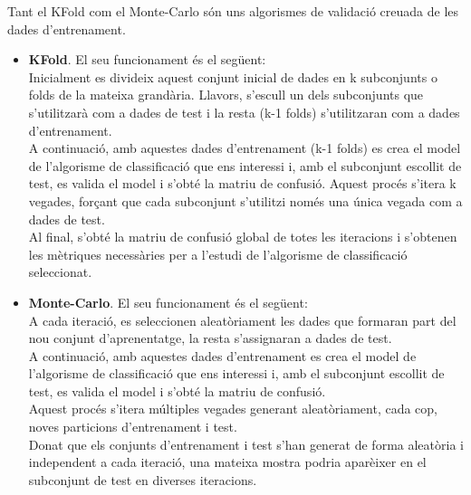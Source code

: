 \documentclass{article} %
\begin{document}
{\color{blue}
	Tant el KFold com el Monte-Carlo són uns algorismes de validació creuada de les dades d'entrenament. \\

	\begin{itemize}
		\item {
			\textbf{KFold}. El seu funcionament és el següent: \\

			Inicialment es divideix aquest conjunt inicial de dades en k subconjunts o folds de la mateixa grandària. Llavors, s'escull un dels subconjunts que s'utilitzarà com a dades de test i la resta (k-1 folds) s'utilitzaran com a dades d'entrenament. \\

			A continuació, amb aquestes dades d'entrenament (k-1 folds) es crea el model de l'algorisme de classificació que ens interessi i, amb el subconjunt escollit de test, es valida el model i s'obté la matriu de confusió. Aquest procés s'itera k vegades, forçant que cada subconjunt s'utilitzi només una única vegada com a dades de test. \\

			Al final, s'obté la matriu de confusió global de totes les iteracions i s'obtenen les mètriques necessàries per a l'estudi de l'algorisme de classificació seleccionat. \\
		}
		\item {
			\textbf{Monte-Carlo}. El seu funcionament és el següent: \\

			A cada iteració, es seleccionen aleatòriament les dades que formaran part del nou conjunt d'aprenentatge, la resta s'assignaran a dades de test. \\
			
			A continuació, amb aquestes dades d'entrenament es crea el model de l'algorisme de classificació que ens interessi i, amb el subconjunt escollit de test, es valida el model i s'obté la matriu de confusió. \\

			Aquest procés s'itera múltiples vegades generant aleatòriament, cada cop, noves particions d'entrenament i test. \\

			Donat que els conjunts d'entrenament i test s'han generat de forma aleatòria i independent a cada iteració, una mateixa mostra podria aparèixer en el subconjunt de test en diverses iteracions. \\
		}
	\end{itemize}

}
\end{document}
